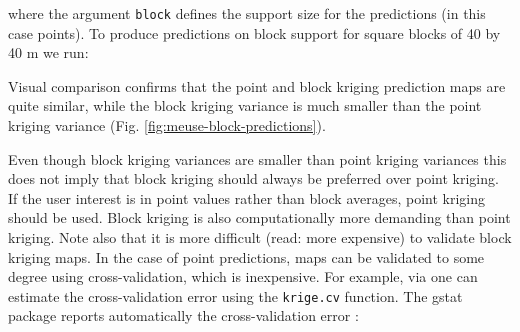 \documentclass[graybox,natbib,nospthms,UStrade]{svmono}
\newenvironment{Shaded}{\begin{snugshade}}{\end{snugshade}}
\newcommand{\CommentTok}[1]{\textcolor[rgb]{0.37,0.37,0.37}{\textit{#1}}}
\newcommand{\DataTypeTok}[1]{\textcolor[rgb]{0.27,0.27,0.27}{#1}}
\newcommand{\DecValTok}[1]{\textcolor[rgb]{0.06,0.06,0.06}{#1}}
\newcommand{\KeywordTok}[1]{\textcolor[rgb]{0.27,0.27,0.27}{\textbf{#1}}}
\newcommand{\NormalTok}[1]{#1}
\newcommand{\StringTok}[1]{\textcolor[rgb]{0.5,0.5,0.5}{#1}}
\begin{document}
where the argument \texttt{block} defines the support size for the predictions
(in this case points). To produce predictions on block support for
square blocks of 40 by 40 m we run:

\begin{Shaded}
\end{Shaded}

Visual comparison confirms that the point and block kriging prediction
maps are quite similar, while the block kriging variance is much smaller
than the point kriging variance
(Fig. \ref{fig:meuse-block-predictions}).

Even though block kriging variances are smaller than point kriging
variances this does not imply that block kriging should always be
preferred over point kriging. If the user interest is in point values
rather than block averages, point kriging should be used. Block kriging
is also computationally more demanding than point kriging. Note also
that it is more difficult (read: more expensive) to validate block
kriging maps. In the case of point predictions, maps can be validated to
some degree using cross-validation, which is inexpensive. For example,
via one can estimate the cross-validation error using the \texttt{krige.cv}
function. The gstat package reports automatically the cross-validation error
\citep{Hengl2013JAG}:
\end{document}
